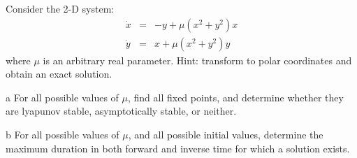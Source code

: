 \documentclass[12pt]{report}
\begin{document}
\begin{problem}
    Consider the 2-D system:
    \begin{eqnarray*} 
        \dot x &=& -y + \mu (x^2 + y^2)x  \\
        \dot y &=& x + \mu (x^2 + y^2) y
    \end{eqnarray*}
    where $\mu$ is an arbitrary real parameter.  Hint:  transform to polar coordinates and obtain an exact solution.
    \item[a]  For all possible values of $\mu$, find all fixed points, and determine whether they are lyapunov stable, asymptotically stable, or neither.

    \item[b]  For all possible values of $\mu$, and all possible initial values, determine the maximum duration in both forward and inverse time for which a solution exists.
\end{problem}
\end{document}

